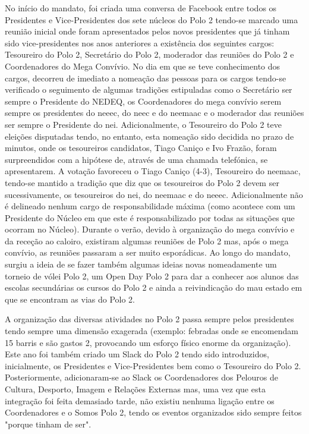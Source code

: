 No início do mandato, foi criada uma conversa de Facebook entre todos os Presidentes e Vice-Presidentes dos sete núcleos do Polo 2 tendo-se marcado uma reunião inicial onde foram apresentados pelos novos presidentes que já tinham sido vice-presidentes nos anos anteriores a existência dos seguintes cargos: Tesoureiro do Polo 2, Secretário do Polo 2, moderador das reuniões do Polo 2 e Coordenadores do Mega Convívio. No dia em que se teve conhecimento dos cargos, decorreu de imediato a nomeação das pessoas para os cargos tendo-se verificado o seguimento de algumas tradições estipuladas como o Secretário ser sempre o Presidente do NEDEQ, os Coordenadores do mega convívio serem sempre os presidentes do \acrshort{neeec}, do \acrshort{neec} e do \acrshort{neemaac} e o moderador das reuniões ser sempre o Presidente do \acrshort{nei}. Adicionalmente, o Tesoureiro do Polo 2 teve eleições disputadas tendo, no entanto, esta nomeação sido decidida no prazo de minutos, onde os tesoureiros candidatos, Tiago Caniço e Ivo Frazão, foram surpreendidos com a hipótese de, através de uma chamada telefónica, se apresentarem. A votação favoreceu o Tiago Caniço (4-3), Tesoureiro do \acrshort{neemaac}, tendo-se mantido a tradição que diz que os tesoureiros do Polo 2 devem ser sucessivamente, os tesoureiros do \acrshort{nei}, do \acrshort{neemaac} e do \acrshort{neeec}. Adicionalmente não é delineado nenhum cargo de responsabilidade máxima (como acontece com um Presidente do Núcleo em que este é responsabilizado por todas as situações que ocorram no Núcleo).
Durante o verão, devido à organização do mega convívio e da receção ao caloiro, existiram algumas reuniões de Polo 2 mas, após o mega convívio, as reuniões passaram a ser muito esporádicas. Ao longo do mandato, surgiu a ideia de se fazer também algumas ideias novas nomeadamente um torneio de vólei Polo 2, um Open Day Polo 2 para dar a conhecer aos alunos das escolas secundárias os cursos do Polo 2 e ainda a reivindicação do mau estado em que se encontram as vias do Polo 2.

A organização das diversas atividades no Polo 2 passa sempre pelos presidentes tendo sempre uma dimensão exagerada (exemplo: febradas onde se encomendam 15 barris e são gastos 2, provocando um esforço físico enorme da organização). Este ano foi também criado um Slack do Polo 2 tendo sido introduzidos, inicialmente, os Presidentes e Vice-Presidentes bem como o Tesoureiro do Polo 2. Posteriormente, adicionaram-se ao Slack os Coordenadores dos Pelouros de Cultura, Desporto, Imagem e Relações Externas mas, uma vez que esta integração foi feita demasiado tarde, não existiu nenhuma ligação entre os Coordenadores e o Somos Polo 2, tendo os eventos organizados sido sempre feitos "porque tinham de ser".

